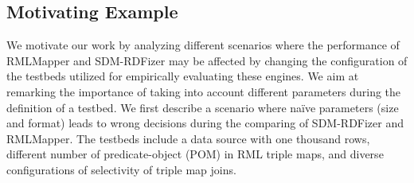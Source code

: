 \subsection{Motivating Example}

We motivate our work by analyzing different scenarios where the performance of RMLMapper and SDM-RDFizer may be affected by changing the configuration of the testbeds utilized for empirically evaluating these engines. We aim at remarking the importance of taking into account different parameters during the definition of a testbed. We first describe a scenario where na\"ive parameters (size and format) leads to wrong decisions during the comparing of SDM-RDFizer and RMLMapper. The testbeds include a data source with one thousand rows, different number of predicate-object (POM) in RML triple maps, and diverse configurations of selectivity of triple map joins.

